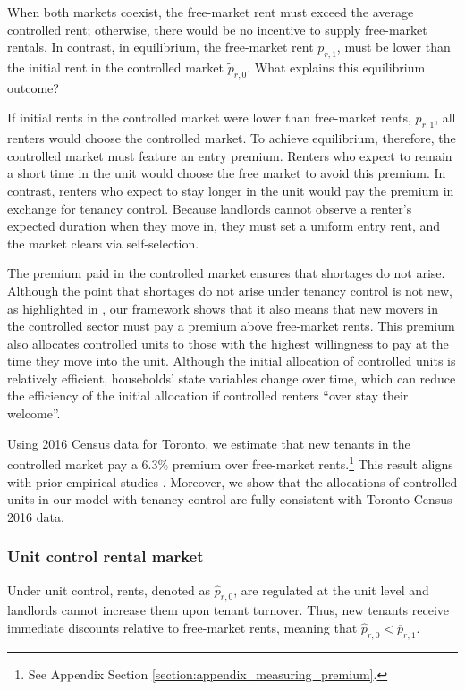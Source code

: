 \documentclass[parskip=full]{article}
\begin{document}
When both markets coexist, the free-market rent must exceed the average controlled rent; otherwise, there would be no incentive to supply free-market rentals. In contrast, in equilibrium, the free-market rent $p_{r,1}$, must be lower than the initial rent in the controlled market $\tilde{p}_{r,0}$. What explains this equilibrium outcome?

If initial rents in the controlled market were lower than free-market rents, $p_{r,1}$, all renters would choose the controlled market. To achieve equilibrium, therefore, the controlled market must feature an entry premium. Renters who expect to remain a short time in the unit would choose the free market to avoid this premium. In contrast, renters who expect to stay longer in the unit would pay the premium in exchange for tenancy control. Because landlords cannot observe a renter's expected duration when they move in, they must set a uniform entry rent, and the market clears via self-selection.

The premium paid in the controlled market ensures that shortages do not arise. Although the point that shortages do not arise under tenancy control is not new, as highlighted in \citet{arnott-1995}, our framework shows that it also means that new movers in the controlled sector must pay a premium above free-market rents. This premium also allocates controlled units to those with the highest willingness to pay at the time they move into the unit. Although the initial allocation of controlled units is relatively efficient, households' state variables change over time, which can reduce the efficiency of the initial allocation if controlled renters ``over stay their welcome''. 

Using 2016 Census data for Toronto, we estimate that new tenants in the controlled market pay a 6.3\% premium over free-market rents.\footnote{See Appendix Section \ref{section:appendix_measuring_premium}.} This result aligns with prior empirical studies \citep{nagy-1997,early-2000,cjq-2023}. Moreover, we show that the allocations of controlled units in our model with tenancy control are fully consistent with Toronto Census 2016 data.

\subsubsection{Unit control rental market}

Under unit control, rents, denoted as $\hat{p}_{r,0}$, are regulated at the unit level and landlords cannot increase them upon tenant turnover. Thus, new tenants receive immediate discounts relative to free-market rents, meaning that $\hat{p}_{r,0}<\overline{p}_{r,1}$. 
\end{document}
